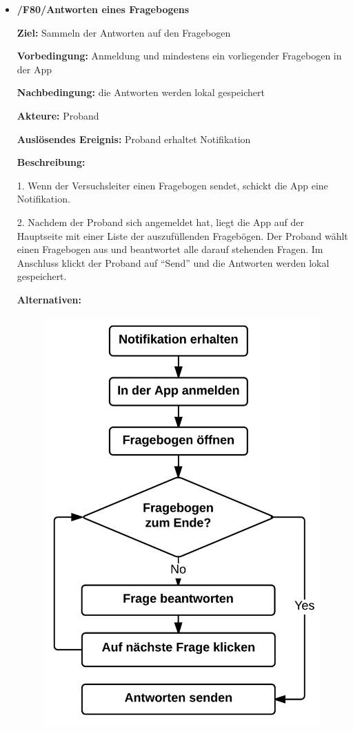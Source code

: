 \documentclass[a4paper]{scrreprt}
\begin{document}
\begin{itemize}
            \item \textbf{/F80/Antworten eines Fragebogens}

            	\par \textbf{Ziel: }Sammeln der Antworten auf den Fragebogen
            	\par \textbf{Vorbedingung: }Anmeldung und mindestens ein vorliegender Fragebogen in der App
            	\par \textbf{Nachbedingung: }die Antworten werden lokal gespeichert
            	\par \textbf{Akteure: }Proband
            	\par \textbf{Auslösendes Ereignis: }Proband erhaltet Notifikation
            	\par \textbf{Beschreibung: }
            	\par 1. Wenn der Versuchsleiter einen Fragebogen sendet, schickt die App eine Notifikation.
            	\par 2. Nachdem der Proband sich angemeldet hat, liegt die App auf der Hauptseite mit einer Liste der auszufüllenden Fragebögen. Der Proband wählt einen Fragebogen aus und beantwortet alle darauf stehenden Fragen. Im Anschluss klickt der Proband auf ``Send'' und die Antworten werden lokal gespeichert.
            	\par \textbf{Alternativen: }
            	\begin{figure}[ht]
            		\centering
            		\includegraphics[scale=0.5]{AppAntworten.jpeg}

\end{figure}
\end{itemize}
\end{document}
